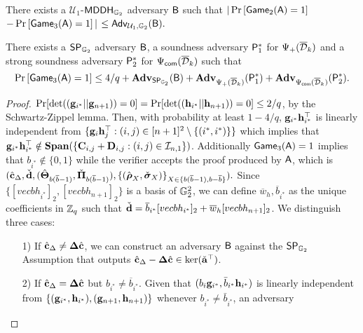 \begin{lemma} There exists a $\mathcal{U}_1$-$\mathsf{MDDH}_{\mathbb{G}_2}$ adversary $\mathsf{B}$ such that
$|\Pr\left[\mathsf{Game}_{2}(\mathsf{A})=1\right]$ $-\Pr\left[\mathsf{Game}_{3}(\mathsf{A})=1\right]|$ $\leq
\mathsf{Adv}_{\mathcal{U}_1,\mathbb{G}_2}(\mathsf{B}).$
\label{lemma:bits3}
\end{lemma}

\begin{lemma} There exists a $\mathsf{SP}_{\mathbb{G}_2}$ adversary $\mathcal{\mathsf{B}}$, a soundness adversary $\mathsf{P}^*_1$  for ${\Psi_{+}(\overline{\mathcal{D}}_k)}$ and 
a strong soundness adversary $\mathsf{P}^*_2$ for ${{\Psi_{\mathsf{com}}(\overline{\mathcal{D}}_k)}}$  such that
$$\Pr\left[\mathsf{Game}_3(\mathsf{A})=1\right] \leq 4/q + \mathbf{Adv}_{\mathsf{SP}_{\mathbb{G}_2}}(\mathsf{B}) +
\mathbf{Adv}_{\Psi_{+}(\overline{\mathcal{D}}_k)}(\mathsf{P}^*_1)+\mathbf{Adv}_{{\Psi_{\mathsf{com}}(\overline{\mathcal{D}}_k)}}(\mathsf{P}^*_2).$$  
\label{lemma:G3}
\end{lemma}
\begin{proof}
$\Pr[\det((\mathbf{g}_{i^*}||\mathbf{g}_{n+1}))=0]=\Pr[\det((\mathbf{h}_{i^*}||\mathbf{h}_{n+1}))=0]\leq2/q$, by the Schwartz-Zippel lemma. Then, with probability at least $1-4/q$, $\mathbf{g}_{i^*}\mathbf{h}_{i^*}^\top$ is linearly independent from
$\{\mathbf{g}_{i}\mathbf{h}_j^\top:(i,j)\in[n+1]^2\setminus\{(i^*, i^*)\}\}$ which implies that $\mathbf{g}_{i^*}\mathbf{h}_{i^*}^\top\notin\mathbf{Span}(\{\mathbf{{C}}_{i,j}+\mathbf{{D}}_{i,j}:(i,j)\in\mathcal{I}_{n,1}\})$. 
Additionally  $\mathsf{Game}_3(\mathsf{A})=1$ implies that $b_{i^*} \notin \{0,1\}$
while the verifier accepts the proof  produced by $\mathsf{A}$, which is
$ (
        {\hat{\mathbf{c}}}_{\Delta}, \check{\mathbf{d}},
        ({\hat{\mathbf{{\Theta}}}}_{b(\overline{b}-1)}, \check{\mathbf{{\Pi}}}_{b(\overline{b}-1)}), 
        \{(\hat{\boldsymbol \rho}_{X}, \check{\boldsymbol \sigma}_{X})\}_{X \in \{b(\overline{b}-1), b-\overline{b}\}} ).$ Since $\{[vecb{h}_{i^*}]_2,[vecb{h}_{n+1}]_2\}$ is a basis of $\mathbb{G}_2^2$,
we can define $\overline{w}_h,\overline{b}_{i^*}$ as the unique coefficients in $\mathbb{Z}_q$ such that $\check{\mathbf{d}}= \overline{b}_{i^*} [vecb{h}_{i^*}]_2 + \overline{w}_h [vecb{h}_{n+1}]_2$.
We distinguish three cases:
\begin{itemize}
\item[1)] If $\hat{\mathbf{c}}_{\Delta} \neq \mathbf{{\Delta}} \hat{\mathbf{c}}$, we can construct an adversary 
$\mathsf{B}$ against the $\mathsf{SP}_{\mathbb{G}_2}$ Assumption that outputs 
$\hat{\mathbf{c}}_{\Delta}-\mathbf{{\Delta}} \hat{\mathbf{c}}\in\ker(\check{\mathbf{{a}}}^\top)$.
\item[2)] If $\hat{\mathbf{c}}_{\Delta} = \mathbf{{\Delta}} \hat{\mathbf{c}}$ but $b_{i^*} \neq \overline{b}_{i^*}$. Given that $(b_{i}\mathbf{g}_{i^*},\bar{b}_{i^*}\mathbf{h}_{i^*})$ is linearly independent from $\{(\mathbf{g}_{i^*},\mathbf{h}_{i^*}),(\mathbf{g}_{n+1},\mathbf{h}_{n+1})\}$
whenever $b_{i^*}\neq\bar{b}_{i^*}$, an adversary

\end{itemize}
\end{proof}
